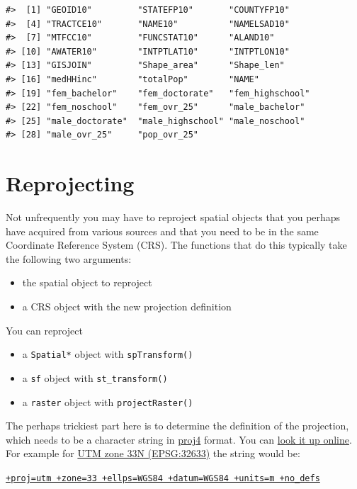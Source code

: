 \documentclass[]{book}
\providecommand{\tightlist}{%
  \setlength{\itemsep}{0pt}\setlength{\parskip}{0pt}}
\theoremstyle{definition}
\theoremstyle{definition}
\theoremstyle{definition}
\theoremstyle{remark}
\begin{document}
\begin{verbatim}
#>  [1] "GEOID10"         "STATEFP10"       "COUNTYFP10"     
#>  [4] "TRACTCE10"       "NAME10"          "NAMELSAD10"     
#>  [7] "MTFCC10"         "FUNCSTAT10"      "ALAND10"        
#> [10] "AWATER10"        "INTPTLAT10"      "INTPTLON10"     
#> [13] "GISJOIN"         "Shape_area"      "Shape_len"      
#> [16] "medHHinc"        "totalPop"        "NAME"           
#> [19] "fem_bachelor"    "fem_doctorate"   "fem_highschool" 
#> [22] "fem_noschool"    "fem_ovr_25"      "male_bachelor"  
#> [25] "male_doctorate"  "male_highschool" "male_noschool"  
#> [28] "male_ovr_25"     "pop_ovr_25"
\end{verbatim}

\section{Reprojecting}\label{reprojecting}

Not unfrequently you may have to reproject spatial objects that you
perhaps have acquired from various sources and that you need to be in
the same Coordinate Reference System (CRS). The functions that do this
typically take the following two arguments:

\begin{itemize}
\tightlist
\item
  the spatial object to reproject
\item
  a CRS object with the new projection definition
\end{itemize}

You can reproject

\begin{itemize}
\tightlist
\item
  a \texttt{Spatial*} object with \texttt{spTransform()}
\item
  a \texttt{sf} object with \texttt{st\_transform()}
\item
  a \texttt{raster} object with \texttt{projectRaster()}
\end{itemize}

The perhaps trickiest part here is to determine the definition of the
projection, which needs to be a character string in
\href{http://trac.osgeo.org/proj/}{proj4} format. You can
\href{http://www.spatialreference.org}{look it up online}. For example
for \href{http://spatialreference.org/ref/epsg/wgs-84-utm-zone-33n/}{UTM
zone 33N (EPSG:32633)} the string would be:

\href{http://spatialreference.org/ref/epsg/wgs-84-utm-zone-33n/proj4js/}{\texttt{+proj=utm\ +zone=33\ +ellps=WGS84\ +datum=WGS84\ +units=m\ +no\_defs}}
\end{document}
